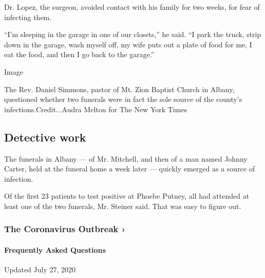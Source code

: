 Dr. Lopez, the surgeon, avoided contact with his family for two weeks,
for fear of infecting them.

``I'm sleeping in the garage in one of our closets,'' he said. ``I park
the truck, strip down in the garage, wash myself off, my wife puts out a
plate of food for me, I eat the food, and then I go back to the
garage.''

Image

The Rev. Daniel Simmons, pastor of Mt. Zion Baptist Church in Albany,
questioned whether two funerals were in fact the sole source of the
county's infections.Credit...Audra Melton for The New York Times

\hypertarget{detective-work}{%
\subsection{Detective work}\label{detective-work}}

The funerals in Albany --- of Mr. Mitchell, and then of a man named
Johnny Carter, held at the funeral home a week later --- quickly emerged
as a source of infection.

Of the first 23 patients to test positive at Phoebe Putney, all had
attended at least one of the two funerals, Mr. Steiner said. That was
easy to figure out.

\href{https://www.nytimes.com/news-event/coronavirus?action=click\&pgtype=Article\&state=default\&region=MAIN_CONTENT_3\&context=storylines_faq}{}

\hypertarget{the-coronavirus-outbreak-}{%
\subsubsection{The Coronavirus Outbreak
›}\label{the-coronavirus-outbreak-}}

\hypertarget{frequently-asked-questions}{%
\paragraph{Frequently Asked
Questions}\label{frequently-asked-questions}}

Updated July 27, 2020

